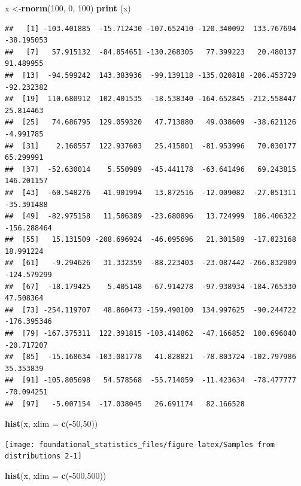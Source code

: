 \documentclass[]{book}
\newenvironment{Shaded}{\begin{snugshade}}{\end{snugshade}}
\newcommand{\DataTypeTok}[1]{\textcolor[rgb]{0.13,0.29,0.53}{#1}}
\newcommand{\DecValTok}[1]{\textcolor[rgb]{0.00,0.00,0.81}{#1}}
\newcommand{\KeywordTok}[1]{\textcolor[rgb]{0.13,0.29,0.53}{\textbf{#1}}}
\newcommand{\NormalTok}[1]{#1}
\newcommand{\OperatorTok}[1]{\textcolor[rgb]{0.81,0.36,0.00}{\textbf{#1}}}
\begin{document}
\begin{Shaded}
\begin{Highlighting}[]
\NormalTok{x <-}\KeywordTok{rnorm}\NormalTok{(}\DecValTok{100}\NormalTok{, }\DecValTok{0}\NormalTok{, }\DecValTok{100}\NormalTok{)}
\KeywordTok{print}\NormalTok{ (x)}
\end{Highlighting}
\end{Shaded}

\begin{verbatim}
##   [1] -103.401885  -15.712430 -107.652410 -120.340092  133.767694  -38.195053
##   [7]   57.915132  -84.854651 -130.268305   77.399223   20.480137   91.489955
##  [13]  -94.599242  143.383936  -99.139118 -135.020818 -206.453729  -92.232382
##  [19]  110.680912  102.401535  -18.538340 -164.652845 -212.558447   25.814463
##  [25]   74.686795  129.059320   47.713880   49.038609  -38.621126   -4.991785
##  [31]    2.160557  122.937603   25.415801  -81.953996   70.030177   65.299991
##  [37]  -52.630014    5.550989  -45.441178  -63.641496   69.243815  146.201157
##  [43]  -60.548276   41.901994   13.872516  -12.009082  -27.051311  -35.391488
##  [49]  -82.975158   11.506389  -23.680896   13.724999  186.406322 -156.288464
##  [55]   15.131509 -208.696924  -46.095696   21.301589  -17.023168   18.991224
##  [61]   -9.294626   31.332359  -88.223403  -23.087442 -266.832909 -124.579299
##  [67]  -18.179425    5.405148  -67.914278  -97.938934 -184.765330   47.508364
##  [73] -254.119707   48.860473 -159.490100  134.997625  -90.244722 -176.395346
##  [79] -167.375311  122.391815 -103.414862  -47.166852  100.696040  -20.717207
##  [85]  -15.168634 -103.081778   41.828821  -78.803724 -102.797986   35.353839
##  [91] -105.805698   54.578568  -55.714059  -11.423634  -78.477777  -70.094251
##  [97]   -5.007154  -17.038045   26.691174   82.166528
\end{verbatim}

\begin{Shaded}
\begin{Highlighting}[]
\KeywordTok{hist}\NormalTok{(x, }\DataTypeTok{xlim =} \KeywordTok{c}\NormalTok{(}\OperatorTok{-}\DecValTok{50}\NormalTok{,}\DecValTok{50}\NormalTok{))}
\end{Highlighting}
\end{Shaded}

\texttt{[image: foundational\_statistics\_files/figure-latex/Samples from distributions 2-1]}

\begin{Shaded}
\begin{Highlighting}[]
\KeywordTok{hist}\NormalTok{(x, }\DataTypeTok{xlim =} \KeywordTok{c}\NormalTok{(}\OperatorTok{-}\DecValTok{500}\NormalTok{,}\DecValTok{500}\NormalTok{))}
\end{Highlighting}
\end{Shaded}
\end{document}
